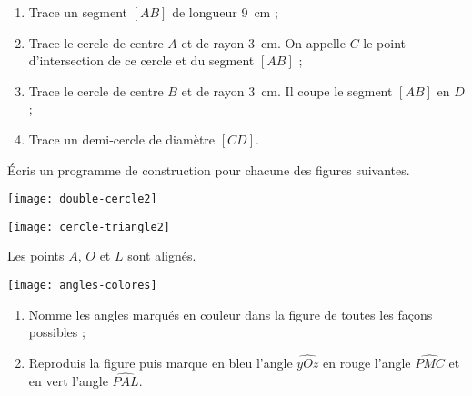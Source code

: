 \begin{exercice}
\begin{enumerate}
 \item Trace un segment $[AB]$ de longueur 9 cm ;
 \item Trace le cercle de centre $A$ et de rayon 3 cm. On appelle $C$ le point d'intersection de ce cercle et du segment $[AB]$ ;
 \item Trace le cercle de centre $B$ et de rayon 3 cm. Il coupe le segment $[AB]$ en $D$ ;
 \item Trace un demi‑cercle de diamètre $[CD]$.
 \end{enumerate}
\end{exercice}


\begin{exercice}
Écris un programme de construction pour chacune des figures suivantes.

\begin{colenumerate}{1}
 \item 
 
 \texttt{[image: double-cercle2]}
 \item 

\texttt{[image: cercle-triangle2]}
 \end{colenumerate}
\end{exercice}





\begin{exercice}
Les points $A$, $O$ et $L$ sont alignés.
 \begin{center} \texttt{[image: angles-colores]}  \end{center}
\begin{enumerate}
 \item Nomme les angles marqués en couleur dans la figure de toutes les façons possibles ; 
 \item Reproduis la figure puis marque en bleu l'angle $\widehat{yOz}$ en rouge l'angle $\widehat{PMC}$ et en vert l'angle $\widehat{PAL}$.
 \end{enumerate}
\end{exercice}


